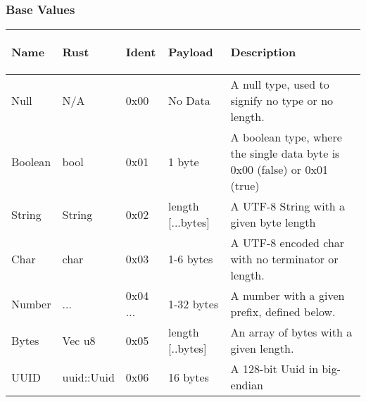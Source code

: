 \documentclass{report}
\begin{document}
\subsubsection{Base Values}
\vspace{5mm}
\begin{adjustwidth}{-1.5cm}{}
\begin{tabular}{| m{5.5em} | m{4.5em} | m{5em} | m{7em} | m{12em} |}
\hline
\begin{center} \textbf{Name} \end{center} &
 \begin{center} \textbf{Rust} \end{center} &
  \begin{center} \textbf{Ident} \end{center} &
   \begin{center} \textbf{Payload} \end{center} &
    \begin{center} \textbf{Description} \end{center} \\
\hline
Null & N/A & 0x00 & No Data & A null type, used to signify no type or no length. \\
\hline
Boolean & bool & 0x01 & 1 byte & A boolean type, where the single data byte is 0x00 (false) or 0x01 (true) \\
\hline
String & String & 0x02 & length [...bytes] & A UTF-8 String with a given byte length \\
\hline
Char & char & 0x03 & 1-6 bytes & A UTF-8 encoded char with no terminator or length. \\
\hline
Number & ... & 0x04 ... & 1-32 bytes & A number with a given prefix, defined below.  \\
\hline
Bytes & Vec u8 & 0x05 & length [..bytes] & An array of bytes with a given length. \\
\hline
UUID & uuid::Uuid & 0x06 & 16 bytes & A 128-bit Uuid in big-endian  \\
\hline
\end{tabular}
\end{adjustwidth}
\end{document}

